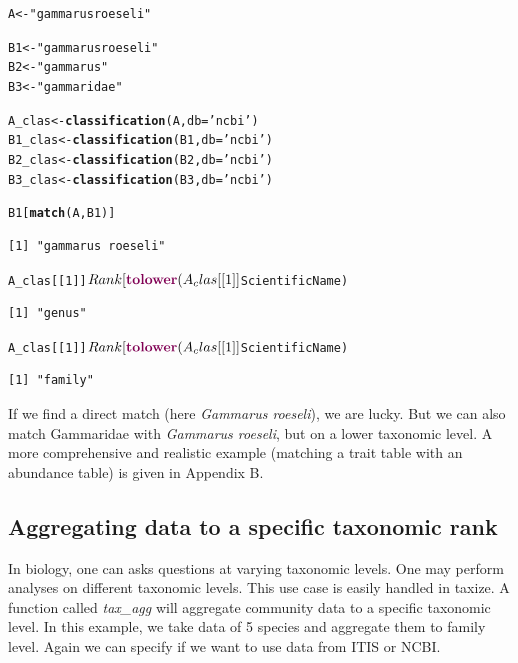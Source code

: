 \documentclass[10pt]{article}\usepackage[]{graphicx}\usepackage[]{color}
\makeatletter
\newcommand{\hlfunctioncall}[1]{\textcolor[rgb]{0.501960784313725,0,0.329411764705882}{\textbf{#1}}}%
\newcommand{\hlstring}[1]{\textcolor[rgb]{0.6,0.6,1}{#1}}%
\newenvironment{kframe}{%
 \def\at@end@of@kframe{}%
 \ifinner\ifhmode%
  \def\at@end@of@kframe{\end{minipage}}%
  \begin{minipage}{\columnwidth}%
 \fi\fi%
 \def\FrameCommand##1{\hskip\@totalleftmargin \hskip-\fboxsep
 \colorbox{shadecolor}{##1}\hskip-\fboxsep
     \hskip-\linewidth \hskip-\@totalleftmargin \hskip\columnwidth}%
 \MakeFramed {\advance\hsize-\width
   \@totalleftmargin\z@ \linewidth\hsize
   \@setminipage}}%
 {\par\unskip\endMakeFramed%
 \at@end@of@kframe}
\newenvironment{knitrout}{}{} %
\makeatother
\begin{document}
\begin{knitrout}
\color{fgcolor}\begin{kframe}
\begin{alltt}
A <- \hlstring{"gammarus roeseli"} 

B1 <- \hlstring{"gammarus roeseli"}
B2 <- \hlstring{"gammarus"}
B3 <- \hlstring{"gammaridae"}

A_clas <- \hlfunctioncall{classification}(A, db = \hlstring{'ncbi'})
B1_clas <- \hlfunctioncall{classification}(B1, db = \hlstring{'ncbi'})
B2_clas <- \hlfunctioncall{classification}(B2, db = \hlstring{'ncbi'})
B3_clas <- \hlfunctioncall{classification}(B3, db = \hlstring{'ncbi'})


B1[\hlfunctioncall{match}(A, B1)]
\end{alltt}
\begin{verbatim}
[1] "gammarus roeseli"
\end{verbatim}
\begin{alltt}
A_clas[[1]]$Rank[\hlfunctioncall{tolower}(A_clas[[1]]$ScientificName) %
\end{alltt}
\begin{verbatim}
[1] "genus"
\end{verbatim}
\begin{alltt}
A_clas[[1]]$Rank[\hlfunctioncall{tolower}(A_clas[[1]]$ScientificName) %
\end{alltt}
\begin{verbatim}
[1] "family"
\end{verbatim}
\end{kframe}
\end{knitrout}


If we find a direct match (here \emph{Gammarus roeseli}), we are lucky. But we can also match Gammaridae with \emph{Gammarus roeseli}, but on a lower taxonomic level. A more comprehensive and realistic example (matching a trait table with an abundance table) is given in Appendix B.


\subsection*{Aggregating data to a specific taxonomic rank}
In biology, one can asks questions at varying taxonomic levels. One may perform analyses on different taxonomic levels. This use case is easily handled in taxize. A function called \emph{tax\_agg} will aggregate community data to a specific taxonomic level. In this example, we take data of 5 species and aggregate them to family level. Again we can specify if we want to use data from ITIS or NCBI.
\end{document}
